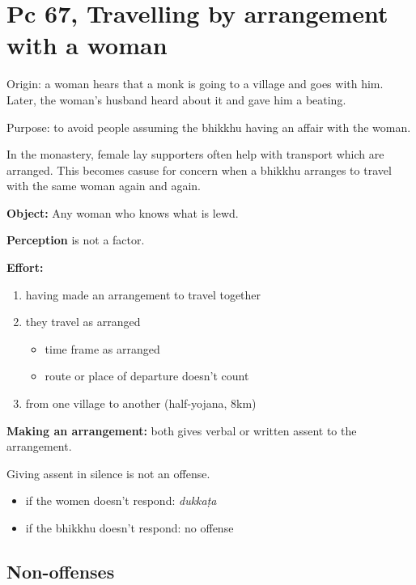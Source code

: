 \section{Pc 67, Travelling by arrangement with a woman}

Origin: a woman hears that a monk is going to a village and goes with
him. Later, the woman's husband heard about it and gave him a beating.

Purpose: to avoid people assuming the bhikkhu having an affair with the
woman.

In the monastery, female lay supporters often help with transport which
are arranged. This becomes casuse for concern when a bhikkhu arranges to
travel with the same woman again and again.

\textbf{Object:} Any woman who knows what is lewd.

\textbf{Perception} is not a factor.

\textbf{Effort:}

\begin{enumerate}
\def\labelenumi{\arabic{enumi}.}
\tightlist
\item
  having made an arrangement to travel together
\item
  they travel as arranged

  \begin{itemize}
  \tightlist
  \item
    time frame as arranged
  \item
    route or place of departure doesn't count
  \end{itemize}
\item
  from one village to another (half-yojana, 8km)
\end{enumerate}

\textbf{Making an arrangement:} both gives verbal or written assent to
the arrangement.

Giving assent in silence is not an offense.

\begin{itemize}
\tightlist
\item
  if the women doesn't respond: \emph{dukkaṭa}
\item
  if the bhikkhu doesn't respond: no offense
\end{itemize}

\subsection{Non-offenses}

